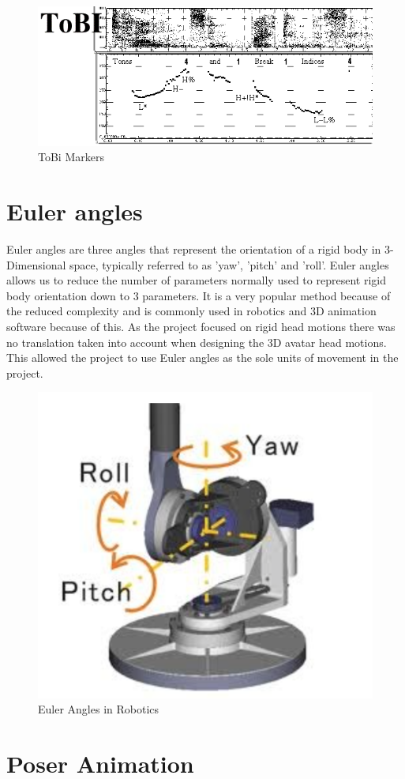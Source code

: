 \documentclass[bsc,frontabs,twoside,singlespacing,parskip]{infthesis}
\begin{document}
\begin{figure}[h!]
	\centering
	\includegraphics[width=1\textwidth]{tobi.png}
	\caption{ToBi Markers}
\end{figure}

\section{Euler angles}

Euler angles are three angles that represent the orientation of a rigid body in 3-Dimensional space, typically referred to as 'yaw', 'pitch' and 'roll'. Euler angles allows us to reduce the number of parameters normally used to represent rigid body orientation down to 3 parameters. It is a very popular method because of the reduced complexity and is commonly used in robotics and 3D animation software because of this. As the project focused on rigid head motions there was no translation taken into account when designing the 3D avatar head motions. This allowed the project to use Euler angles as the sole units of movement in the project.

\begin{figure}[h!]
	\centering
	\includegraphics[width=.5\textwidth]{euler_angles.png}
	\caption{Euler Angles in Robotics}
\end{figure}


\section{Poser Animation}
\end{document}
